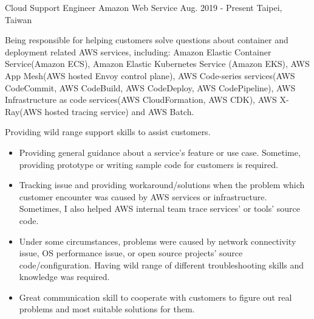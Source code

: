 

\begin{cventries}

    \cventry
        {Cloud Support Engineer}
        {Amazon Web Service}
        {Aug. 2019 - Present}
        {Taipei, Taiwan}
        {
            \begin{cvitems}
                \item
                    {
                        Being responsible for helping customers solve questions about container and deployment related AWS services, including: Amazon Elastic Container Service(Amazon ECS), Amazon Elastic Kubernetes Service (Amazon EKS), AWS App Mesh(AWS hosted Envoy control plane), AWS Code-series services(AWS CodeCommit, AWS CodeBuild, AWS CodeDeploy, AWS CodePipeline), AWS Infrastructure as code services(AWS CloudFormation, AWS CDK), AWS X-Ray(AWS hosted tracing service) and AWS Batch.
                    }
                \item
                    {
                        Providing wild range support skills to assist customers.
                        \begin{itemize}
                            \item Providing general guidance about a service's feature or use case. Sometime, providing prototype or writing sample code for customers is required.
                            \item Tracking issue and providing workaround/solutions when the problem which customer encounter was caused by AWS services or infrastructure. Sometimes, I also helped AWS internal team trace services' or tools' source code.
                            \item Under some circumstances, problems were caused by network connectivity issue, OS performance issue, or open source projects' source code/configuration. Having wild range of different troubleshooting skills and knowledge was required.
                            \item Great communication skill to cooperate with customers to figure out real problems and most suitable solutions for them.
                        \end{itemize}
                    }
            \end{cvitems}
        }


\end{cventries}
